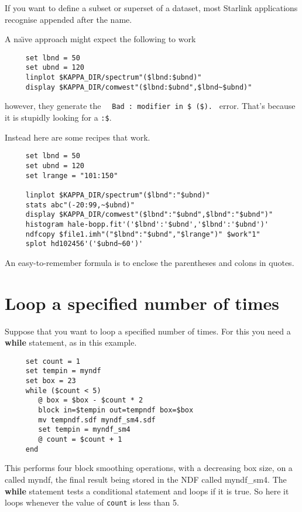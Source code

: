If you want to define a subset or superset of a dataset, most Starlink
applications recognise 
appended after the name.

A na\"{\i}ve approach might expect the following to work

\small
\begin{verbatim}
     set lbnd = 50
     set ubnd = 120
     linplot $KAPPA_DIR/spectrum"($lbnd:$ubnd)"
     display $KAPPA_DIR/comwest"($lbnd:$ubnd",$lbnd~$ubnd)"
\end{verbatim}
\normalsize
however, they generate the ~~{\tt Bad : modifier in \$ (\$).}~ error.
That's because it is stupidly looking for a  {\tt :\$}.

Instead here are some recipes that work.

\small
\begin{verbatim}
     set lbnd = 50
     set ubnd = 120
     set lrange = "101:150"

     linplot $KAPPA_DIR/spectrum"($lbnd":"$ubnd)"
     stats abc"(-20:99,~$ubnd)"
     display $KAPPA_DIR/comwest"($lbnd":"$ubnd",$lbnd":"$ubnd")"
     histogram hale-bopp.fit'('$lbnd':'$ubnd','$lbnd':'$ubnd')'
     ndfcopy $file1.imh"("$lbnd":"$ubnd","$lrange")" $work"1"
     splot hd102456'('$ubnd~60')'
\end{verbatim}
\normalsize
An easy-to-remember formula is to enclose the parentheses and colons
in quotes.

\newpage
\section{Loop a specified number of times
\label{sc4_se_loop_times}}
Suppose that you want to loop a specified number of times.  For this
you need a {\bf while} statement, as in this example.

\small
\begin{verbatim}
     set count = 1
     set tempin = myndf
     set box = 23
     while ($count < 5)
        @ box = $box - $count * 2
        block in=$tempin out=tempndf box=$box
        mv tempndf.sdf myndf_sm4.sdf
        set tempin = myndf_sm4
        @ count = $count + 1
     end
\end{verbatim}
\normalsize
This performs four block smoothing operations, with a decreasing box
size, on a  called myndf, the final result being
stored in the NDF called myndf\_sm4.  The {\bf while} statement tests
a conditional statement and loops if it is true.  So here it loops
whenever the value of {\tt count} is less than 5.

